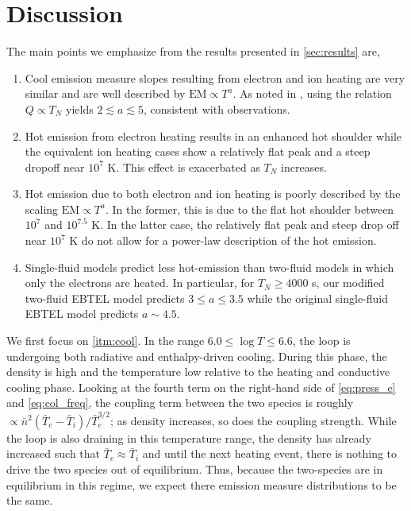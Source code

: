 \documentclass[tighten,apj]{emulateapj}
\begin{document}
	\section{Discussion}
	\label{sec:discussion}
	\par The main points we emphasize from the results presented in \autoref{sec:results} are,
	\begin{enumerate}
		\item Cool emission measure slopes resulting from electron and ion heating are very similar and are well described by $\mathrm{EM}\propto T^a$. As noted in \citet{cargill_active_2014}, using the relation $Q\propto T_N$ yields $2\lesssim a\lesssim5$, consistent with observations.\label{itm:cool}
		\item Hot emission from electron heating results in an enhanced hot shoulder while the equivalent ion heating cases show a relatively flat peak and a steep dropoff near $10^7$ K. This effect is exacerbated as $T_N$ increases.\label{itm:hot}
		\item Hot emission due to both electron and ion heating is poorly described by the scaling $\mathrm{EM}\propto T^a$. In the former, this is due to the flat hot shoulder between $10^7$ and $10^{7.5}$ K. In the latter case, the relatively flat peak and steep drop off near $10^7$ K do not allow for a power-law description of the hot emission.\label{itm:deriv}
		\item Single-fluid models predict less hot-emission than two-fluid models in which only the electrons are heated. In particular, for $T_N\ge4000$ s, our modified two-fluid EBTEL model predicts $3\le a\le3.5$ while the original single-fluid EBTEL model predicts $a\sim4.5$.\label{itm:histos}
	\end{enumerate}
	\par We first focus on \autoref{itm:cool}. In the range $6.0\le\log{T}\le6.6$, the loop is undergoing both radiative and enthalpy-driven cooling. During this phase, the density is high and the temperature low relative to the heating and conductive cooling phase. Looking at the fourth term on the right-hand side of \autoref{eq:press_e} and \autoref{eq:col_freq}, the coupling term between the two species is roughly $\propto\bar{n}^2(\bar{T}_e-\bar{T}_i)/\bar{T}_e^{3/2}$; as density increases, so does the coupling strength. While the loop is also draining in this temperature range, the density has already increased such that $\bar{T}_e\approx\bar{T}_i$ and until the next heating event, there is nothing to drive the two species out of equilibrium. Thus, because the two-species are in equilibrium in this regime, we expect there emission measure distributions to be the same.
\end{document}
